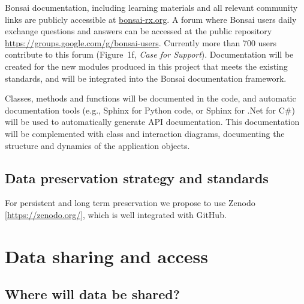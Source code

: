 \documentclass[a4paper,11pt]{article}
\renewcommand{\footnote}[1]{ [#1]}
\begin{document}

Bonsai documentation, including learning materials and all relevant community
links are publicly accessible at \url{bonsai-rx.org}. A forum where Bonsai
users daily exchange questions and answers can be accessed at the public
repository \url{https://groups.google.com/g/bonsai-users}. Currently more than
700 users contribute to this forum (Figure~1f, \emph{Case for Support}).
Documentation will be created for the new modules produced in this project that
meets the existing standards, and will be integrated into the Bonsai
documentation framework.

Classes, methods and functions will be documented in the code, and automatic
documentation tools (e.g., Sphinx for Python code, or Sphinx for .Net for C\#)
will be used to automatically generate API documentation. This documentation
will be complemented with class and interaction diagrams, documenting the
structure and dynamics of the application objects.

\subsection{Data preservation strategy and standards}


For persistent and long term preservation we propose to use
Zenodo\footnote{\url{https://zenodo.org/}}, which is well integrated with
GitHub.

\pagebreak

\section{Data sharing and access}
\subsection{Where will data be shared?}
\end{document}
